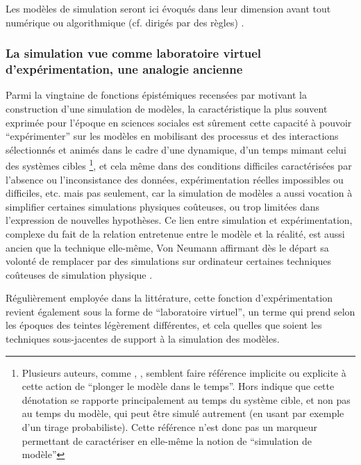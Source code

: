 Les modèles de simulation seront ici évoqués dans leur dimension avant tout numérique ou algorithmique (cf. dirigés par des règles) \autocite[36-38]{Varenne2013}.

\subsubsection{La simulation vue comme laboratoire virtuel d'expérimentation, une analogie ancienne}
\label{ssec:labo_virtuelle}

Parmi la vingtaine de fonctions épistémiques recensées par \textcite[14-23]{Varenne2013} motivant la construction d'une simulation de modèles, la caractéristique la plus souvent exprimée pour l'époque en sciences sociales est sûrement cette capacité à pouvoir \enquote{expérimenter} sur les modèles en mobilisant des processus et des interactions sélectionnés et animés dans le cadre d'une dynamique, d'un temps mimant celui des systèmes cibles \footnote{Plusieurs auteurs, comme \autocite[462]{Gullahorn1965}, \autocite[296]{Doran1970}, \autocite[294-295]{Batty1976} semblent faire référence implicite ou explicite à cette action de \enquote{plonger le modèle dans le temps}. Hors \autocite[31]{Varenne2013} indique que cette dénotation se rapporte principalement au temps du système cible, et non pas au temps du modèle, qui peut être simulé autrement (en usant par exemple d'un tirage probabiliste). Cette référence n'est donc pas un marqueur permettant de caractériser en elle-même la notion de \enquote{simulation de modèle}}, et cela même dans des conditions difficiles caractérisées par l'absence ou l'inconsistance des données, expérimentation réelles impossibles ou difficiles, etc. mais pas seulement, car la simulation de modèles a aussi vocation à simplifier certaines simulations physiques coûteuses, ou trop limitées dans l'expression de nouvelles hypothèses. Ce lien entre simulation et expérimentation, complexe du fait de la relation entretenue entre le modèle et la réalité, est aussi ancien que la technique elle-même, Von Neumann affirmant dès le départ sa volonté de remplacer par des simulations sur ordinateur certaines techniques coûteuses de simulation physique \autocite[15]{Winsberg2013}.

Régulièrement employée dans la littérature, cette fonction d’expérimentation revient également sous la forme de \enquote{laboratoire virtuel}, un terme qui prend selon les époques des teintes légèrement différentes, et cela quelles que soient les techniques sous-jacentes de support à la simulation des modèles.


